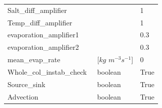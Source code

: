 \documentclass[twocolumn]{article}
\begin{document}
\begin{appendices}
\begin{table}[H]
\begin{tabular}{lll}
Salt\_diff\_amplifier       &                               & 1         \\
Temp\_diff\_amplifier       &                               & 1         \\
evaporation\_amplifier1     &                               & 0.3       \\
evaporation\_amplifier2     &                               & 0.3       \\
mean\_evap\_rate            &{[}$kg$ $m^{-3}s^{-1}${]}      & 0         \\
Whole\_col\_instab\_check\  &  boolean                      & True      \\
Source\_sink                &  boolean                      & True      \\
Advection                   &  boolean                      & True   
\end{tabular}
\end{table}



% 


\end{appendices}
\end{document}
